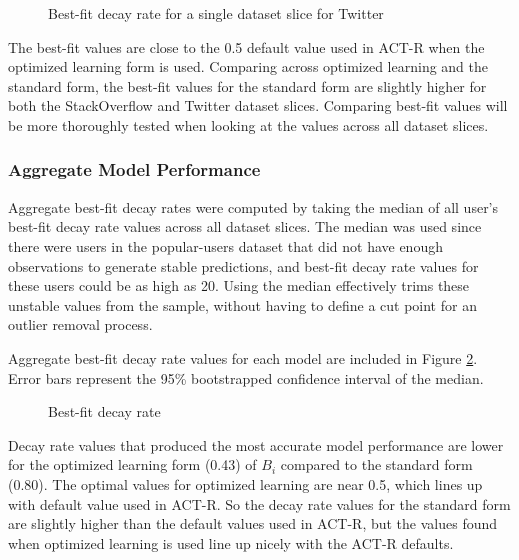 \documentclass[man,floatsintext,donotrepeattitle]{apa6}
\begin{document}
\begin{figure}[!htbp]
  {%
    \setlength{\fboxsep}{0pt}%
    \setlength{\fboxrule}{1pt}%
    \hfill
    \hfill
    \caption{Best-fit decay rate for a single dataset slice for Twitter}
    \label{figPriorTwitterHistDsOL}
  }%
\end{figure}

The best-fit values are close to the \num{0.5} default value used in ACT-R when the optimized learning form is used.
Comparing across optimized learning and the standard form, the best-fit values for the standard form are slightly higher for both the StackOverflow and Twitter dataset slices.
Comparing best-fit values will be more thoroughly tested when looking at the values across all dataset slices.

\subsubsection{Aggregate Model Performance}

Aggregate best-fit decay rates were computed by taking the median of all user's best-fit decay rate values across all dataset slices.
The median was used since there were users in the popular-users dataset that did not have enough observations to generate stable predictions, and best-fit decay rate values for these users could be as high as 20.
Using the median effectively trims these unstable values from the sample, without having to define a cut point for an outlier removal process.

Aggregate best-fit decay rate values for each model are included in Figure \ref{figPriorDecay}.
Error bars represent the 95\% bootstrapped confidence interval of the median.

\begin{figure}[!htbp]
  \caption{Best-fit decay rate}
  \label{figPriorDecay}
\end{figure}

Decay rate values that produced the most accurate model performance are lower for the optimized learning form (\num{0.43}) of $B_{i}$ compared to the standard form (\num{0.80}).
The optimal values for optimized learning are near \num{0.5}, which lines up with default value used in ACT-R.
So the decay rate values for the standard form are slightly higher than the default values used in ACT-R, but the values found when optimized learning is used line up nicely with the ACT-R defaults.
\end{document}
